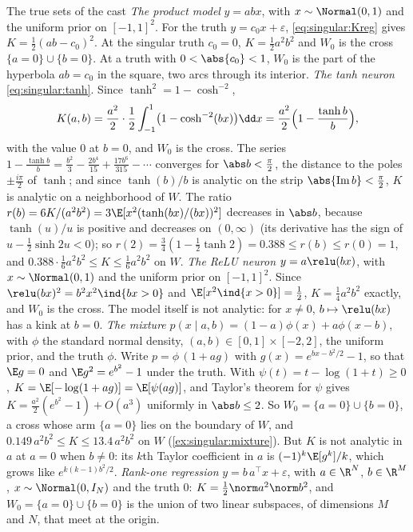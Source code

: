 \begin{refsection}
\begin{computation}{The true sets of the cast}\label{comp:singular:cast}
\step \emph{The product model} $y=abx$, with $x\sim\Normal(0,1)$ and the uniform prior on $[-1,1]^2$. For the truth $y=c_0x+\varepsilon$, \eqref{eq:singular:Kreg} gives $K=\frac12(ab-c_0)^2$. At the singular truth $c_0=0$, $K=\frac12a^2b^2$ and $W_0$ is the cross $\{a=0\}\cup\{b=0\}$. At a truth with $0<\abs{c_0}<1$, $W_0$ is the part of the hyperbola $ab=c_0$ in the square, two arcs through its interior.
\step \emph{The tanh neuron} \eqref{eq:singular:tanh}. Since $\tanh^2=1-\cosh^{-2}$,
\[
K(a,b)=\frac{a^2}2\cdot\frac12\int_{-1}^1\bigl(1-\cosh^{-2}(bx)\bigr)\dd x=\frac{a^2}2\Bigl(1-\frac{\tanh b}b\Bigr),
\]
with the value $0$ at $b=0$, and $W_0$ is the cross. The series $1-\frac{\tanh b}b=\frac{b^2}3-\frac{2b^4}{15}+\frac{17b^6}{315}-\cdots$ converges for $\abs b<\frac\pi2$, the distance to the poles $\pm\frac{i\pi}2$ of $\tanh$; and since $\tanh(b)/b$ is analytic on the strip $\abs{\operatorname{Im}b}<\frac\pi2$, $K$ is analytic on a neighborhood of $W$. The ratio $r(b)=6K/(a^2b^2)=3\E[x^2(\tanh(bx)/(bx))^2]$ decreases in $\abs b$, because $\tanh(u)/u$ is positive and decreases on $(0,\infty)$ (its derivative has the sign of $u-\frac12\sinh2u<0$); so $r(2)=\frac34(1-\frac12\tanh2)=0.388\le r(b)\le r(0)=1$, and $0.388\cdot\frac16a^2b^2\le K\le\frac16a^2b^2$ on $W$.
\step \emph{The ReLU neuron} $y=a\relu(bx)$, with $x\sim\Normal(0,1)$ and the uniform prior on $[-1,1]^2$. Since $\relu(bx)^2=b^2x^2\ind\{bx>0\}$ and $\E[x^2\ind\{x>0\}]=\frac12$, $K=\frac14a^2b^2$ exactly, and $W_0$ is the cross. The model itself is not analytic: for $x\ne0$, $b\mapsto\relu(bx)$ has a kink at $b=0$.
\step \emph{The mixture} $p(x\mid a,b)=(1-a)\phi(x)+a\phi(x-b)$, with $\phi$ the standard normal density, $(a,b)\in[0,1]\times[-2,2]$, the uniform prior, and the truth $\phi$. Write $p=\phi\,(1+ag)$ with $g(x)=e^{bx-b^2/2}-1$, so that $\E g=0$ and $\E g^2=e^{b^2}-1$ under the truth. With $\psi(t)=t-\log(1+t)\ge0$, $K=\E[-\log(1+ag)]=\E[\psi(ag)]$, and Taylor's theorem for $\psi$ gives $K=\frac{a^2}2(e^{b^2}-1)+O(a^3)$ uniformly in $\abs b\le2$. So $W_0=\{a=0\}\cup\{b=0\}$, a cross whose arm $\{a=0\}$ lies on the boundary of $W$, and $0.149\,a^2b^2\le K\le13.4\,a^2b^2$ on $W$ (\cref{ex:singular:mixture}). But $K$ is not analytic in $a$ at $a=0$ when $b\ne0$: its $k$th Taylor coefficient in $a$ is $(-1)^k\E[g^k]/k$, which grows like $e^{k(k-1)b^2/2}$.
\step \emph{Rank-one regression} $y=b\,a^\top x+\varepsilon$, with $a\in\R^N$, $b\in\R^M$, $x\sim\Normal(0,I_N)$ and the truth $0$: $K=\frac12\norm a^2\norm b^2$, and $W_0=\{a=0\}\cup\{b=0\}$ is the union of two linear subspaces, of dimensions $M$ and $N$, that meet at the origin.
\end{computation}


\end{refsection}
